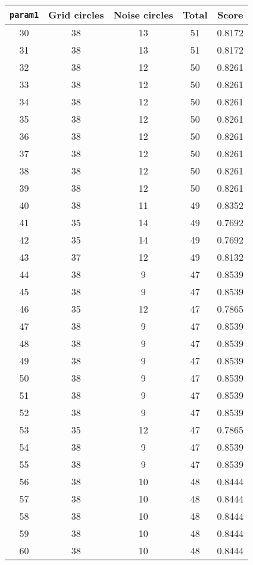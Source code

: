 \documentclass[letterpaper, 12pt]{article}
\begin{document}
\begin{longtable}{|c|c|c|c|c|}
\hline
\textbf{\texttt{param1}} & \textbf{Grid circles} & \textbf{Noise circles} & \textbf{Total} & \textbf{Score} \\
\hline
30 & 38 & 13 & 51 & 0.8172 \\
\hline
31 & 38 & 13 & 51 & 0.8172 \\
\hline
32 & 38 & 12 & 50 & 0.8261 \\
\hline
33 & 38 & 12 & 50 & 0.8261 \\
\hline
34 & 38 & 12 & 50 & 0.8261 \\
\hline
35 & 38 & 12 & 50 & 0.8261 \\
\hline
36 & 38 & 12 & 50 & 0.8261 \\
\hline
37 & 38 & 12 & 50 & 0.8261 \\
\hline
38 & 38 & 12 & 50 & 0.8261 \\
\hline
39 & 38 & 12 & 50 & 0.8261 \\
\hline
40 & 38 & 11 & 49 & 0.8352 \\
\hline
41 & 35 & 14 & 49 & 0.7692 \\
\hline
42 & 35 & 14 & 49 & 0.7692 \\
\hline
43 & 37 & 12 & 49 & 0.8132 \\
\hline
44 & 38 & 9 & 47 & 0.8539 \\
\hline
45 & 38 & 9 & 47 & 0.8539 \\
\hline
46 & 35 & 12 & 47 & 0.7865 \\
\hline
47 & 38 & 9 & 47 & 0.8539 \\
\hline
48 & 38 & 9 & 47 & 0.8539 \\
\hline
49 & 38 & 9 & 47 & 0.8539 \\
\hline
50 & 38 & 9 & 47 & 0.8539 \\
\hline
51 & 38 & 9 & 47 & 0.8539 \\
\hline
52 & 38 & 9 & 47 & 0.8539 \\
\hline
53 & 35 & 12 & 47 & 0.7865 \\
\hline
54 & 38 & 9 & 47 & 0.8539 \\
\hline
55 & 38 & 9 & 47 & 0.8539 \\
\hline
56 & 38 & 10 & 48 & 0.8444 \\
\hline
57 & 38 & 10 & 48 & 0.8444 \\
\hline
58 & 38 & 10 & 48 & 0.8444 \\
\hline
59 & 38 & 10 & 48 & 0.8444 \\
\hline
60 & 38 & 10 & 48 & 0.8444 \\

\end{longtable}
\end{document}
